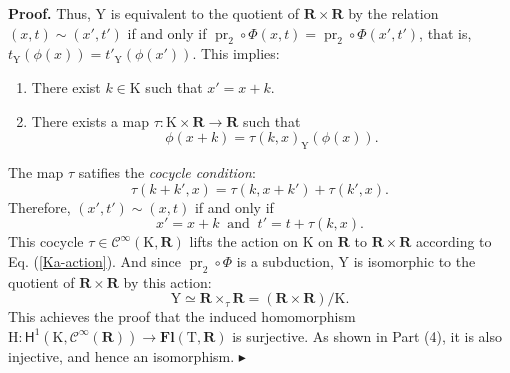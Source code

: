 \documentclass[10pt,letterpaper,reqno]{amsart}
\theoremstyle{article}
\renewenvironment{proof}{\noindent \textbf{Proof.}} {\nolinebreak $\blacktriangleright$}
\newcommand{\1}{{\hat 1}}
\newcommand{\0}{{\hat 0}}
\newcommand{\RR}{\mathbf R}
\newcommand{\sfbH}{{\boldsymbol{\mathsf H}}}
\def \H{\mathrm H}
\def \K{\mathrm K}
\def \T{\mathrm T}
\def \Y{\mathrm Y}
\newcommand{\Cinfty}{\mathcal{C}^\infty}
\DeclareMathOperator{\Fb}{\boldsymbol{\mathsf{Fl}}}
\newcommand{\Ka}{\K}
\newcommand{\pr}{\operatorname{pr}}
\renewcommand{\Fb}{\mathbf{Fl}}
\def \H{\mathrm H}
\begin{document}
\begin{proof}
    Thus,
    $\Y$ is equivalent to the quotient of $\RR \times \RR$ by the relation $(x,t) \sim (x',t')$ if and only if $\pr_2 \circ \Phi(x,t) = \pr_2 \circ \Phi(x',t')$,
    that is,
    $t_\Y(\phi(x)) =  t'_\Y(\phi(x'))$.
    This implies:
    \begin{enumerate}
      \item There exist $k \in \Ka$ such that $x' = x + k$.
      \item There exists a map $\tau : \Ka \times \RR \to \RR$ such that
      $$
        \phi(x+k) = \tau(k,x)_\Y(\phi(x)).
        $$
    \end{enumerate}
    The map $\tau$ satifies the \emph{cocycle condition}:
    \begin{equation*} %
      \label{tau-cocycle}
      \tau(k+k',x) = \tau(k, x+k') + \tau(k',x).
    \end{equation*}
    Therefore,
    $(x',t') \sim (x,t)$ if and only if
    $$
      x' = x + k
      \ \text{ and } \
      t' = t + \tau(k,x).
      $$
    This cocycle $\tau \in \Cinfty(\Ka,\RR)$ lifts the action on $\Ka$ on $\RR$ to $\RR \times \RR$ according to Eq. (\ref{Ka-action}).
    And since $\pr_2 \circ \Phi$ is a subduction,
    $\Y$ is isomorphic to the quotient of $\RR \times \RR$ by this action:
    $$
      \Y \simeq \RR \times_\tau \RR = (\RR \times \RR)/ \Ka.
      $$
    This achieves the proof that the induced homomorphism $\H : \sfbH^1(\Ka,\Cinfty(\RR)) \to \Fb(\T,\RR)$ is surjective.
    As shown in Part (4),
    it is also injective,
    and hence an isomorphism.
  \end{proof}
  
  
\end{document}
